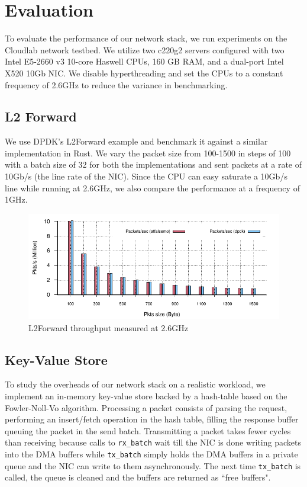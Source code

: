 \chapter{Evaluation} 

\label{Chapter5}

To evaluate the performance of our network stack, we run experiments on the Cloudlab network testbed. We utilize two c220g2 servers  configured with two Intel E5-2660 v3 10-core Haswell CPUs, 160 GB RAM, and a dual-port Intel X520 10Gb NIC. We disable hyperthreading and set the CPUs to a constant frequency of 2.6GHz to reduce the variance in benchmarking. 

\section{L2 Forward}
We use DPDK's L2Forward example and benchmark it against a similar implementation in Rust. We vary the packet size from 100-1500 in steps of 100 with a batch size of 32 for both the implementations and sent packets at a rate of 10Gb/s (the line rate of the NIC). Since the CPU can easy saturate a 10Gb/s line while running at 2.6GHz, we also compare the performance at a frequency of 1GHz. 

\begin{figure}[!htbp]
	\includegraphics[width=1.0\columnwidth]{figures/l2fwd26.pdf}
\caption{L2Forward throughput measured at 2.6GHz}
	\label{fig:l2fwd26}
\end{figure}


\section{Key-Value Store}
To study the overheads of our network stack on a realistic workload, we implement an in-memory key-value store backed by a hash-table based on the Fowler-Noll-Vo algorithm. Processing a packet consists of parsing the request, performing an insert/fetch operation in the hash table, filling the response buffer queuing the packet in the send batch. Transmitting a packet takes fewer cycles than receiving because calls to \lstinline{rx_batch} wait till the NIC is done writing packets into the DMA buffers while \lstinline{tx_batch} simply holds the DMA buffers in a private queue and the NIC can write to them asynchronously. The next time \lstinline{tx_batch} is called, the queue is cleaned and the buffers are returned as ``free buffers".

